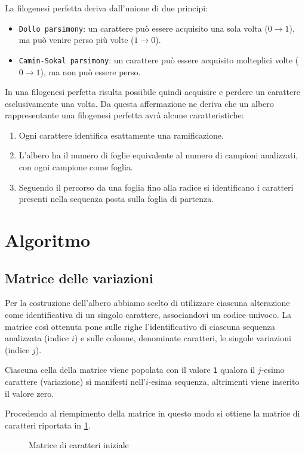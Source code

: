 \documentclass[11pt,italian]{article}
\begin{document}
\noindent
La filogenesi perfetta deriva dall'unione di due principi:
\begin{itemize}
	\item \lstinline{Dollo parsimony}: un carattere può essere acquisito una sola volta ($0 \to 1$), ma può venire perso più volte ($1 \to 0$).
	\item \lstinline{Camin-Sokal parsimony}: un carattere può essere acquisito molteplici volte ($0 \to 1$), ma non può essere perso.
\end{itemize}
In una filogenesi perfetta risulta possibile quindi acquisire e perdere un carattere esclusivamente una volta.
Da questa affermazione ne deriva che un albero rappresentante una filogenesi perfetta avrà alcune caratteristiche:
\begin{enumerate}
	\item Ogni carattere identifica esattamente una ramificazione.
	\item L'albero ha il numero di foglie equivalente al numero di campioni analizzati, con ogni campione come foglia.
	\item Seguendo il percorso da una foglia fino alla radice si identificano i caratteri presenti nella sequenza posta sulla foglia di partenza.
\end{enumerate}

\newpage
\section{Algoritmo}
\subsection{Matrice delle variazioni}
Per la costruzione dell'albero abbiamo scelto di utilizzare ciascuna alterazione come identificativa di un singolo carattere, associandovi un codice univoco. La matrice così ottenuta pone sulle righe l'identificativo di ciascuna sequenza analizzata (indice $i$) e sulle colonne, denominate caratteri, le singole variazioni (indice $j$).

Ciascuna cella della matrice viene popolata con il valore \lstinline{1} qualora il $j$-esimo carattere (variazione) si manifesti nell'$i$-esima sequenza, altrimenti viene inserito il valore zero.

Procedendo al riempimento della matrice in questo modo si ottiene la matrice di caratteri riportata in \cref{fig:matrix-characters}.

\begin{figure}[H]
  \caption{Matrice di caratteri iniziale}
  \label{fig:matrix-characters}
\end{figure}
\end{document}
